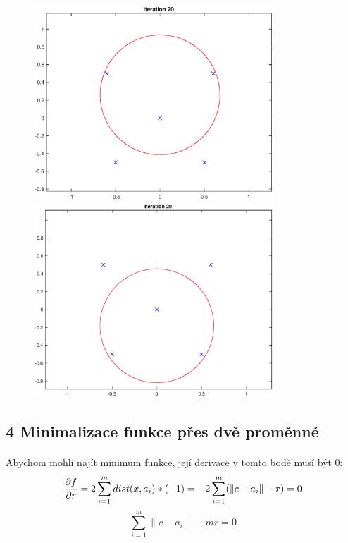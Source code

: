 \documentclass[11pt]{article}
\begin{document}
\begin{figure}[h]
    
    \begin{minipage}{0.45\textwidth}
        
        \includegraphics[width=9cm]{circle1.eps}
    \end{minipage}\hfill
    \hspace{.05\linewidth}
    \begin{minipage}{0.45\textwidth}
        \centering
        \includegraphics[width=9cm]{circle2.eps}
    \end{minipage}
\end{figure}

\subsection*{4 Minimalizace funkce přes dvě proměnné}
\paragraph{}

Abychom mohli najít minimum funkce, její derivace v tomto bodě musí být 0:
$$ \pdv{f}{r} = 2 \sum_{i = 1}^{m} dist(x, a_{i})* (-1) = -2 \sum_{i = 1}^{m} (\|c-a_{i}\| - r) = 0$$
$$ \sum_{i = 1}^{m} \|c-a_{i}\| - mr = 0$$
\end{document}
